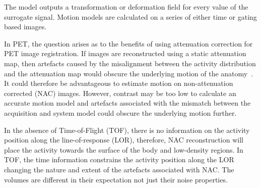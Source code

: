 \documentclass[journal]{IEEEtran}
\begin{document}
The model outputs a transformation or deformation field for every value of the surrogate signal. Motion models are calculated on a series of either time or gating based images.

In PET, the question arises as to the benefits of using attenuation correction for PET image registration. If images are reconstructed using a static attenuation map, then artefacts caused by the misalignment between the activity distribution and the attenuation map would obscure the underlying motion of the anatomy~\cite{Bousse2016a}. It could therefore be advantageous to estimate motion on non-attenuation corrected (NAC) images. However, contrast may be too low to calculate an accurate motion model and artefacts associated with the mismatch between the acquisition and system model could obscure the underlying motion further. 



In the absence of Time-of-Flight (TOF), there is no information on the activity position along the line-of-response (LOR), therefore, NAC reconstruction will place the activity towards the surface of the body and low-density regions. In TOF, the time information constrains the activity position along the LOR changing the nature and extent of the artefacts associated with NAC. The volumes are different in their expectation not just their noise properties.
\end{document}
